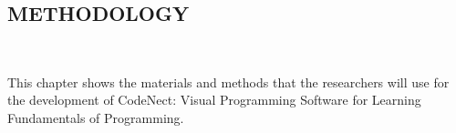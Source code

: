 \begin{doublespace}
	\begin{center}
		\section*{METHODOLOGY}
	\end{center}

	\leavevmode\\
	\par
	\justifying
	This chapter shows the materials and methods that the researchers will use
	for the development of CodeNect: Visual Programming Software for Learning
	Fundamentals of Programming.

	
	

\end{doublespace}
